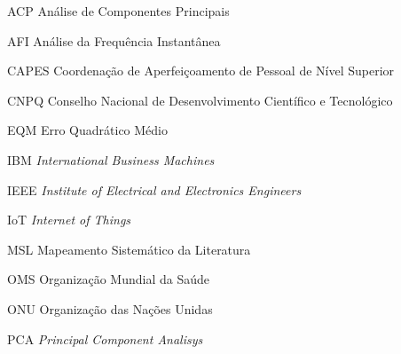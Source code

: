 \documentclass[
    a4paper,        %
    12pt,           %
    oneside,        %
    openright,      %
    final,          %
    sumario=tradicional, %
    english,        %
    french,         %
    spanish,        %
    brazil          %
    ]{abntex2}
\newcommand{\ingles}[1]{\foreignlanguage{english}{\emph{#1}}}
\begin{document}
\begin{siglas}%
    \item[]
    \begin{alineas}[
        font=\normalfont,
        format=\normalsize,
        align=parleft,
        itemsep=1ex,
        leftmargin=-2em,itemindent=0em,labelindent=0em,labelwidth=6em,labelsep=0em]
        \item[ACP]          Análise de Componentes Principais
        \item[AFI]          Análise da Frequência Instantânea
        \item[CAPES]        Coordenação de Aperfeiçoamento de Pessoal de Nível Superior
        \item[CNPQ]         Conselho Nacional de Desenvolvimento Científico e Tecnológico
        \item[EQM]          Erro Quadrático Médio
        \item[IBM]          \ingles{International Business Machines}
        \item[IEEE]         \ingles{Institute of Electrical and Electronics Engineers}
        \item[IoT]          \ingles{Internet of Things}
        \item[MSL]          Mapeamento Sistemático da Literatura
        \item[OMS]          Organização Mundial da Saúde
        \item[ONU]          Organização das Nações Unidas
        \item[PCA]          \ingles{Principal Component Analisys}
    \end{alineas}
\end{siglas}
\clearpage{}
\end{document}
